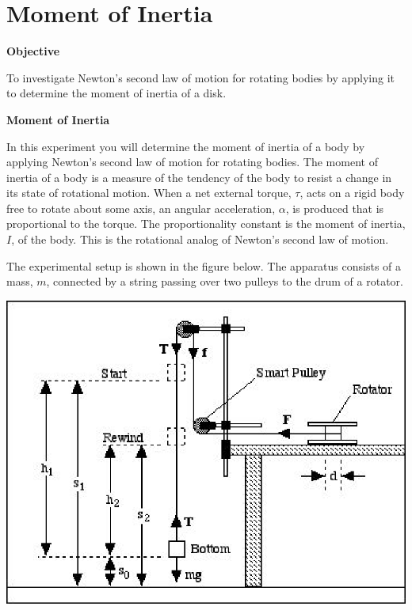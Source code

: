 
\section{Moment of Inertia}

\makelabheader %

\textbf{Objective} 

To investigate Newton's second law of motion for rotating bodies by applying
it to determine the moment of inertia of a disk.

\textbf{Moment of Inertia} 

In this experiment you will determine the moment of inertia of a body by applying
Newton's second law of motion for rotating bodies. The moment of inertia of
a body is a measure of the tendency of the body to resist a change in its state
of rotational motion. When a net external torque, 
$\tau$, acts on a rigid body free
to rotate about some axis, an angular acceleration, 
$\alpha$, is produced that is
proportional to the torque. The proportionality constant is the moment of inertia,
$I$, of the body. This is the rotational analog of Newton's second law of motion. 

The experimental setup is shown in the figure below. The apparatus consists
of a mass, $m$, connected by a string passing over two pulleys to the drum of
a rotator.

\vspace{0.3cm}
{\par\centering \includegraphics{moment_inertia_fig1.eps} \par}
\vspace{0.3cm}

